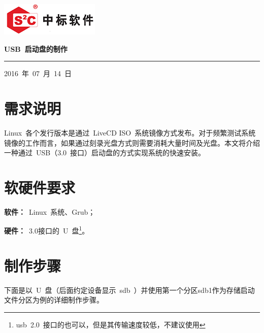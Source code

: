 \documentclass[a4paper]{ctexart}
\begin{document}
\thispagestyle{empty}

\noindent\begin{minipage}{\textwidth}
	\begin{flushleft}
	\includegraphics{logo/cs2c-short-logo}
	\end{flushleft}
\end{minipage}

\noindent\begin{minipage}{\textwidth}
\centering
{\LARGE \bfseries USB~启动盘的制作}
\noindent\rule[1.5ex]{\textwidth}{1pt}
\end{minipage}

\noindent\begin{center}
2016~年~07~月~14~日
\end{center}
\clearpage


\section{需求说明}
Linux~各个发行版本是通过~LiveCD ISO~系统镜像方式发布。对于频繁测试系统镜像的工作而言，如果通过刻录光盘方式则需要消耗大量时间及光盘。本文将介绍一种通过~USB（3.0~接口）启动盘的方式实现系统的快速安装。

\section{软硬件要求}
\textbf{软件：}~Linux~系统、Grub；

\textbf{硬件：}~3.0接口的~U~盘\footnote{usb~2.0~接口的也可以，但是其传输速度较低，不建议使用}。

\section{制作步骤}
下面是以~U~盘（后面约定设备显示~sdb~）并使用第一个分区sdb1作为存储启动文件分区为例的详细制作步骤。
\end{document}
